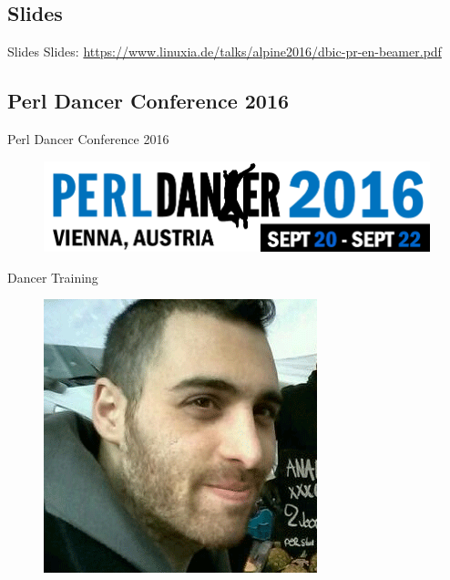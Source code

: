 \subsection{Slides}
\begin{frame}{Slides}
Slides:
\url{https://www.linuxia.de/talks/alpine2016/dbic-pr-en-beamer.pdf}
\end{frame}

\subsection{Perl Dancer Conference 2016}
\begin{frame}{Perl Dancer Conference 2016}
\begin{figure}[!ht]
\centering
\includegraphics[width=1\linewidth]{img/perl-dancer-homepage-logo-2016.png}
\end{figure}
\end{frame}

\begin{frame}{Dancer Training}
\begin{figure}[!ht]
\centering
\includegraphics[width=0.6\linewidth]{img/sawyer.png}
\end{figure}
\end{frame}

